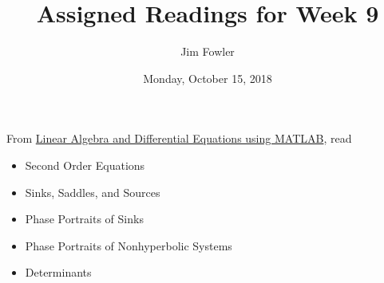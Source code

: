 \documentclass{homework}
\author{Jim Fowler}
\title{Assigned Readings for Week 9}
\date{Monday, October 15, 2018}
\begin{document}
\maketitle

From \href{/courses/43735/files/folder/textbooks}{Linear Algebra and Differential Equations using MATLAB}, read 
\begin{itemize}
\item {} Second Order Equations
\item {} Sinks, Saddles, and Sources
\item {} Phase Portraits of Sinks
\item {} Phase Portraits of Nonhyperbolic Systems
\item {} Determinants
\end{itemize}
\end{document}
